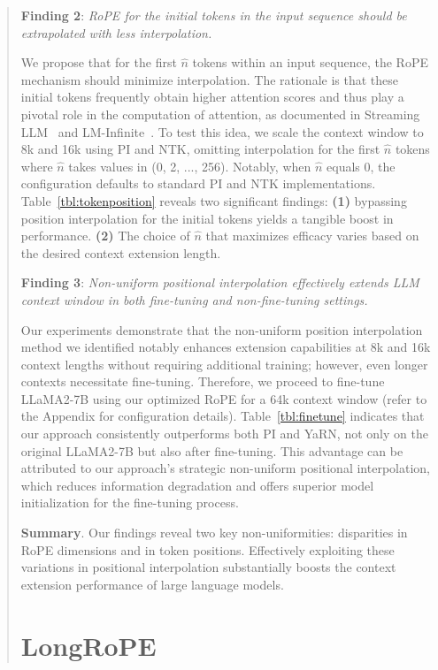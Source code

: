 \begin{abstract}
\textbf{Finding 2}: \textit{RoPE for the initial tokens in the input sequence should be extrapolated with less interpolation.} 

We propose that for the first $\hat{n}$ tokens within an input sequence, the RoPE mechanism should minimize interpolation. The rationale is that these initial tokens frequently obtain higher attention scores and thus play a pivotal role in the computation of attention, as documented in Streaming LLM~\cite{streamingllm} and LM-Infinite~\cite{han2023lminfinite}. To test this idea, we scale the context window to 8k and 16k using PI and NTK, omitting interpolation for the first $\hat n$ tokens where $\hat n$ takes values in (0, 2, ..., 256). Notably, when $\hat n$ equals 0, the configuration defaults to standard PI and NTK implementations. Table~\ref{tbl:tokenposition} reveals two significant findings: \textbf{(1)} bypassing position interpolation for the initial tokens yields a tangible boost in performance. \textbf{(2)} The choice of $\hat n$ that maximizes efficacy varies based on the desired context extension length.

\textbf{Finding 3}: \textit{Non-uniform positional interpolation effectively extends LLM context window in both fine-tuning and non-fine-tuning settings.} 

Our experiments demonstrate that the non-uniform position interpolation method we identified notably enhances extension capabilities at 8k and 16k context lengths without requiring additional training; however, even longer contexts necessitate fine-tuning. Therefore, we proceed to fine-tune LLaMA2-7B using our optimized RoPE for a 64k context window (refer to the Appendix for configuration details). Table~\ref{tbl:finetune} indicates that our approach consistently outperforms both PI and YaRN, not only on the original LLaMA2-7B but also after fine-tuning. This advantage can be attributed to our approach’s strategic non-uniform positional interpolation, which reduces information degradation and offers superior model initialization for the fine-tuning process.

\textbf{Summary}. Our findings reveal two key non-uniformities: disparities in RoPE dimensions and in token positions. Effectively exploiting these variations in positional interpolation substantially boosts the context extension performance of large language models.

\section{LongRoPE}


\end{abstract}

